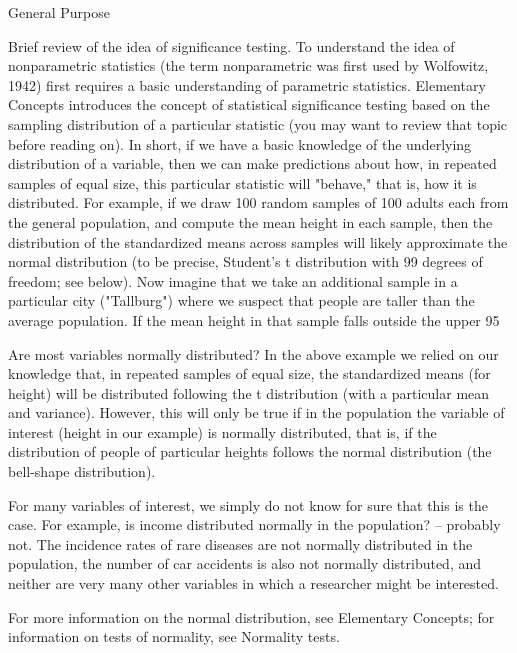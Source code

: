 General Purpose

Brief review of the idea of significance testing. To understand the idea of nonparametric statistics (the term nonparametric was first used by Wolfowitz, 1942) first requires a basic understanding of parametric statistics. Elementary Concepts introduces the concept of statistical significance testing based on the sampling distribution of a particular statistic (you may want to review that topic before reading on). In short, if we have a basic knowledge of the underlying distribution of a variable, then we can make predictions about how, in repeated samples of equal size, this particular statistic will "behave," that is, how it is distributed. For example, if we draw 100 random samples of 100 adults each from the general population, and compute the mean height in each sample, then the distribution of the standardized means across samples will likely approximate the normal distribution (to be precise, Student's t distribution with 99 degrees of freedom; see below). Now imagine that we take an additional sample in a particular city ("Tallburg") where we suspect that people are taller than the average population. If the mean height in that sample falls outside the upper 95%

Are most variables normally distributed? In the above example we relied on our knowledge that, in repeated samples of equal size, the standardized means (for height) will be distributed following the t distribution (with a particular mean and variance). However, this will only be true if in the population the variable of interest (height in our example) is normally distributed, that is, if the distribution of people of particular heights follows the normal distribution (the bell-shape distribution).



For many variables of interest, we simply do not know for sure that this is the case. For example, is income distributed normally in the population? -- probably not. The incidence rates of rare diseases are not normally distributed in the population, the number of car accidents is also not normally distributed, and neither are very many other variables in which a researcher might be interested.

For more information on the normal distribution, see Elementary Concepts; for information on tests of normality, see Normality tests.

